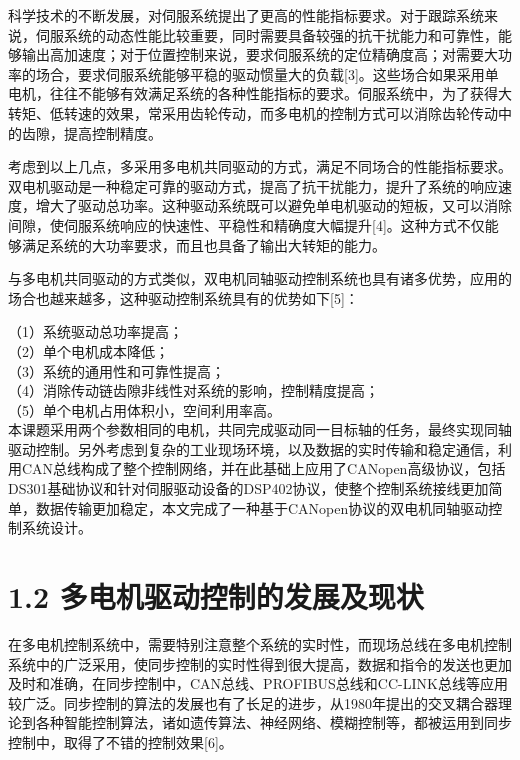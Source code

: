 \documentclass[UTF8,zihao=-4,openany,oneside]{ctexbook}
\begin{document}
科学技术的不断发展，对伺服系统提出了更高的性能指标要求。对于跟踪系统来说，伺服系统的动态性能比较重要，同时需要具备较强的抗干扰能力和可靠性，能够输出高加速度；对于位置控制来说，要求伺服系统的定位精确度高；对需要大功率的场合，要求伺服系统能够平稳的驱动惯量大的负载[3]。这些场合如果采用单电机，往往不能够有效满足系统的各种性能指标的要求。伺服系统中，为了获得大转矩、低转速的效果，常采用齿轮传动，而多电机的控制方式可以消除齿轮传动中的齿隙，提高控制精度。

考虑到以上几点，多采用多电机共同驱动的方式，满足不同场合的性能指标要求。双电机驱动是一种稳定可靠的驱动方式，提高了抗干扰能力，提升了系统的响应速度，增大了驱动总功率。这种驱动系统既可以避免单电机驱动的短板，又可以消除间隙，使伺服系统响应的快速性、平稳性和精确度大幅提升[4]。这种方式不仅能够满足系统的大功率要求，而且也具备了输出大转矩的能力。

与多电机共同驱动的方式类似，双电机同轴驱动控制系统也具有诸多优势，应用的场合也越来越多，这种驱动控制系统具有的优势如下[5]：

\noindent （1）系统驱动总功率提高；\\

\noindent （2）单个电机成本降低；\\

\noindent （3）系统的通用性和可靠性提高；\\

\noindent （4）消除传动链齿隙非线性对系统的影响，控制精度提高；\\

\noindent （5）单个电机占用体积小，空间利用率高。\\

本课题采用两个参数相同的电机，共同完成驱动同一目标轴的任务，最终实现同轴驱动控制。另外考虑到复杂的工业现场环境，以及数据的实时传输和稳定通信，利用CAN总线构成了整个控制网络，并在此基础上应用了CANopen高级协议，包括DS301基础协议和针对伺服驱动设备的DSP402协议，使整个控制系统接线更加简单，数据传输更加稳定，本文完成了一种基于CANopen协议的双电机同轴驱动控制系统设计。

\section{1.2 多电机驱动控制的发展及现状}

在多电机控制系统中，需要特别注意整个系统的实时性，而现场总线在多电机控制系统中的广泛采用，使同步控制的实时性得到很大提高，数据和指令的发送也更加及时和准确，在同步控制中，CAN总线、PROFIBUS总线和CC-LINK总线等应用较广泛。同步控制的算法的发展也有了长足的进步，从1980年提出的交叉耦合器理论到各种智能控制算法，诸如遗传算法、神经网络、模糊控制等，都被运用到同步控制中，取得了不错的控制效果[6]。
\end{document}
